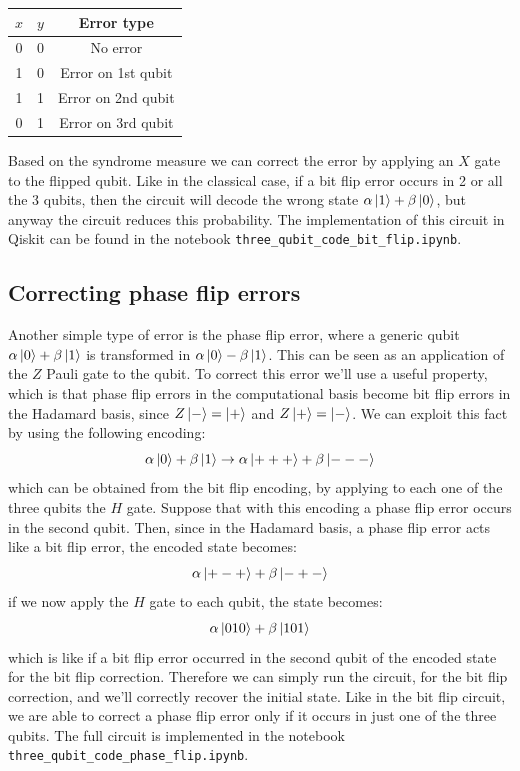 \documentclass{article}
\begin{document}
	\begin{table}[H]
		\centering
		\begin{tabular}{|c|c|c|}
			\hline
			$x$ & $y$ & Error type \\
			\hline
			0 & 0 & No error \\
			\hline
			1 & 0 & Error on 1st qubit\\
			\hline
			1 & 1 & Error on 2nd qubit \\
			\hline
			0 & 1 & Error on 3rd qubit \\
			\hline
		\end{tabular}
	\end{table}
	\noindent Based on the syndrome measure we can correct the error by applying an $X$ gate to the flipped qubit. Like in the classical case, if a bit flip error occurs in 2 or all the 3 qubits, then the circuit will decode the wrong state $\alpha\ket{1} + \beta\ket{0}$, but anyway the circuit reduces this probability. The implementation of this circuit in Qiskit can be found in the notebook \verb|three_qubit_code_bit_flip.ipynb|.
	 

	\subsection{Correcting phase flip errors}
	Another simple type of error is the phase flip error, where a generic qubit $\alpha \ket{0} + \beta\ket{1}$ is transformed in $\alpha\ket{0} - \beta\ket{1}$. This can be seen as an application of the $Z$ Pauli gate to the qubit. To correct this error we'll use a useful property, which is that phase flip errors in the computational basis become bit flip errors in the Hadamard basis, since $Z\ket{-} = \ket{+}$ and $Z\ket{+} = \ket{-}$. We can exploit this fact by using the following encoding:
	\[ \alpha\ket{0} + \beta\ket{1} \rightarrow \alpha\ket{+++} + \beta\ket{---}\]
	which can be obtained from the bit flip encoding, by applying to each one of the three qubits the $H$ gate. Suppose that with this encoding a phase flip error occurs in the second qubit. Then, since in the Hadamard basis, a phase flip error acts like a bit flip error, the encoded state becomes:
	\[ \alpha\ket{+-+} + \beta\ket{-+-} \]
	if we now apply the $H$ gate to each qubit, the state becomes:
	\[ \alpha\ket{010} + \beta\ket{101} \]
	which is like if a bit flip error occurred in the second qubit of the encoded state for the bit flip correction. Therefore we can simply run the circuit, for the bit flip correction, and we'll correctly recover the initial state. Like in the bit flip circuit, we are able to correct a phase flip error only if it occurs in just one of the three qubits. The full circuit is implemented in the notebook \verb|three_qubit_code_phase_flip.ipynb|.
	
\end{document}
